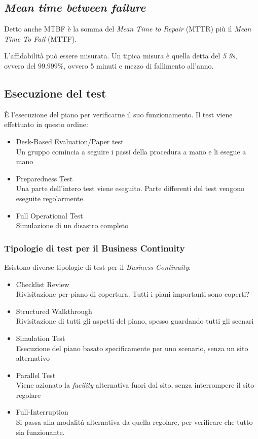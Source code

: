 
\subsection{\textit{Mean time between failure}}

Detto anche MTBF è la somma del \textit{Mean Time to Repair} (MTTR) più il 
\textit{Mean Time To Fail} (MTTF).


L'affidabilità può essere misurata. Un tipica misura è quella detta del 
\textit{5 9s}, ovvero del $99.999\%$, ovvero 5 minuti e mezzo di fallimento 
all'anno.

\subsection{Esecuzione del test}

È l'esecuzione del piano per verificarne il suo funzionamento.
Il test viene effettuato in questo ordine:
\begin{itemize}
  \item Desk-Based Evaluation/Paper test \\
  Un gruppo comincia a seguire i passi della procedura a mano e li esegue a mano
  \item Preparedness Test \\
  Una parte dell'intero test viene eseguito. Parte differenti del test vengono 
  eseguite regolarmente.
  \item Full Operational Test \\
  Simulazione di un disastro completo
\end{itemize}

\subsubsection{Tipologie di test per il Business Continuity}

Esistono diverse tipologie di test per il \textit{Business Continuity}:
\begin{itemize}
  \item Checklist Review \\
  Rivisitazione per piano di copertura. Tutti i piani importanti sono coperti?
  \item Structured Walkthrough \\
  Rivisitazione di tutti gli aspetti del piano, spesso guardando tutti gli 
  scenari
  \item Simulation Test \\
  Esecuzione del piano basato specificamente per uno scenario, senza un sito 
  alternativo
  \item Parallel Test \\
  Viene azionato la \textit{facility} alternativa fuori dal sito, senza 
  interrompere il sito regolare
  \item Full-Interruption \\
  Si passa alla modalità alternativa da quella regolare, per verificare che 
  tutto sia funzionante.
\end{itemize}


